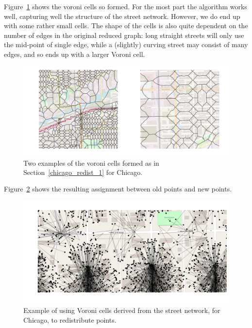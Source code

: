 \documentclass[twoside,a4paper,twocolumn,10pt]{article}
\theoremstyle{plain}
\theoremstyle{definition}
\begin{document}
Figure~\ref{fig:chicago_vor_2} shows the voroni cells so formed.  For the most part the
algorithm works well, capturing well the structure of the street network.  However, we do
end up with some rather small cells.  The shape of the cells is also quite dependent on
the number of edges in the original reduced graph: long straight streets will only use the
mid-point of single edge, while a (slightly) curving street may consist of many edges, and
so ends up with a larger Voroni cell.

\begin{figure}
  \includegraphics[width=\textwidth]{chiago_voroni_street_network_polys.png}
  \caption{Two examples of the voroni cells formed as in Section~\ref{chicago_redist_1} for Chicago.}
  \label{fig:chicago_vor_2}
\end{figure}

Figure~\ref{fig:chicago_vor_1} shows the resulting assignment between old points and
new points.

\begin{figure}
  \includegraphics[width=\textwidth]{chicago_redist_network.png}
  \caption{Example of using Voroni cells derived from the street network, for Chicago, to redistribute points.}
  \label{fig:chicago_vor_1}
\end{figure}
\end{document}
